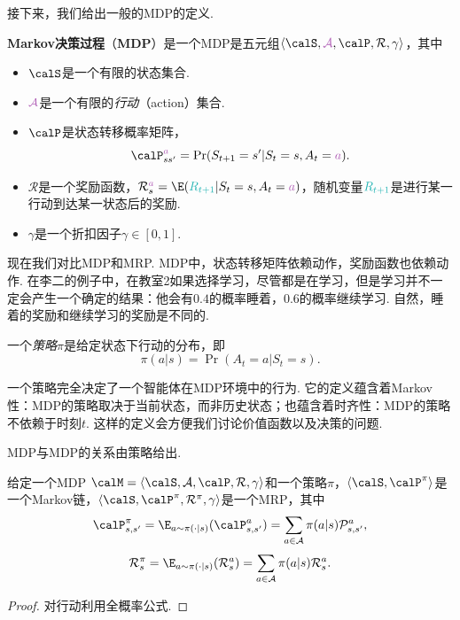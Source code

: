 接下来，我们给出一般的MDP的定义.
\begin{definition}
\textbf{Markov决策过程}（\textbf{MDP}）是一个MDP是五元组$\langle\calS, \textcolor{Orchid}{\mathcal A}, \calP, \mathcal R, \gamma\rangle$，其中
\begin{itemize}
    \item $\calS$是一个有限的状态集合.
    \item $\textcolor{Orchid}{\mathcal A}$是一个有限的\emph{行动}（action）集合.
    \item $\calP$是状态转移概率矩阵，
    \[\calP_{ss'}^{\textcolor{Orchid}{a}} = \Pr(S_{t+1} = s' | S_t = s, A_t = \textcolor{Orchid}{a}).\]
    \item $\mathcal R$是一个奖励函数，$\mathcal R_s^{\textcolor{Orchid}{a}} = \E(\textcolor{TealBlue}{R_{t+1}} | S_t = s, A_t = \textcolor{Orchid}{a})$，随机变量$\textcolor{TealBlue}{R_{t+1}}$是进行某一行动到达某一状态后的奖励.
    \item $\gamma$是一个折扣因子$\gamma\in[0,1]$.
\end{itemize}
\end{definition}

现在我们对比MDP和MRP. MDP中，状态转移矩阵依赖动作，奖励函数也依赖动作. 在李二的例子中，在教室2如果选择学习，尽管都是在学习，但是学习并不一定会产生一个确定的结果：他会有$0.4$的概率睡着，$0.6$的概率继续学习. 自然，睡着的奖励和继续学习的奖励是不同的.

\begin{definition}[策略]
一个\emph{策略}$\pi$是给定状态下行动的分布，即
    \[\pi(a|s) = \Pr(A_t=a | S_t = s).\]
\end{definition}
一个策略完全决定了一个智能体在MDP环境中的行为. 它的定义蕴含着Markov性：MDP的策略取决于当前状态，而非历史状态；也蕴含着时齐性：MDP的策略不依赖于时刻$t$. 这样的定义会方便我们讨论价值函数以及决策的问题.

MDP与MDP的关系由策略给出. 
\begin{proposition}
给定一个MDP $\calM=\langle\calS,\mathcal A,\calP,\mathcal R, \gamma\rangle$和一个策略$\pi$，$\langle \calS, \calP^{\pi}\rangle$是一个Markov链，$\langle\calS,\calP^{\pi}, \mathcal R^{\pi}, \gamma\rangle$是一个MRP，其中
\[\calP_{s,s'}^{\pi} = \E_{a\sim\pi(\cdot|s)}(\calP^a_{s,s'})=\sum_{a\in \mathcal A}\pi(a|s)\mathcal P_{s,s'}^{a},\]
    \[\mathcal R_s^{\pi} =\E_{a\sim\pi(\cdot|s)}(\mathcal R^a_s)=\sum_{a\in\mathcal A}\pi(a|s)\mathcal R_s^a.\]
\end{proposition}
\begin{proof}
对行动利用全概率公式. 
\end{proof}

